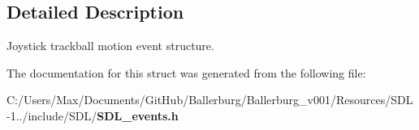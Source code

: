 \subsection{Detailed Description}
Joystick trackball motion event structure. 

The documentation for this struct was generated from the following file\+:\begin{DoxyCompactItemize}
\item 
C\+:/\+Users/\+Max/\+Documents/\+Git\+Hub/\+Ballerburg/\+Ballerburg\+\_\+v001/\+Resources/\+S\+D\+L-\/1../include/\+S\+D\+L/{\bf S\+D\+L\+\_\+events.\+h}\end{DoxyCompactItemize}
